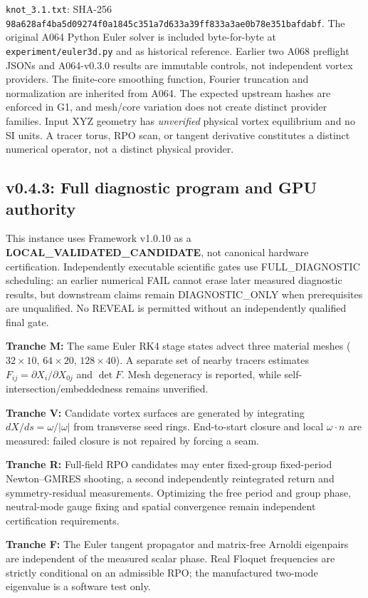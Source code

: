 \documentclass[11pt,a4paper]{article}
\begin{document}
\texttt{knot\_3.1.txt}: SHA-256 \texttt{98a628af4ba5d09274f0a1845c351a7}\allowbreak\texttt{d633a39ff833a3ae0b78e351bafdabf}. The original A064 Python Euler solver is included byte-for-byte at \texttt{experiment/euler3d.py} and as historical reference. Earlier two A068 preflight JSONs and A064-v0.3.0 results are immutable controls, not independent vortex providers. The finite-core smoothing function, Fourier truncation and normalization are inherited from A064. The expected upstream hashes are enforced in G1, and mesh/core variation does not create distinct provider families. Input XYZ geometry has \emph{unverified} physical vortex equilibrium and no SI units. A tracer torus, RPO scan, or tangent derivative constitutes a distinct numerical operator, not a distinct physical provider.

\subsection*{v0.4.3: Full diagnostic program and GPU authority}
This instance uses Framework v1.0.10 as a \textbf{LOCAL\_VALIDATED\_CANDIDATE}, not canonical hardware certification. Independently executable scientific gates use FULL\_DIAGNOSTIC scheduling: an earlier numerical FAIL cannot erase later measured diagnostic results, but downstream claims remain DIAGNOSTIC\_ONLY when prerequisites are unqualified. No REVEAL is permitted without an independently qualified final gate.\par
\textbf{Tranche M:} The same Euler RK4 stage states advect three material meshes ($32\times10$, $64\times20$, $128\times40$). A separate set of nearby tracers estimates $F_{ij}=\partial X_i/\partial X_{0j}$ and $\det F$. Mesh degeneracy is reported, while self-intersection/embeddedness remains unverified.\par
\textbf{Tranche V:} Candidate vortex surfaces are generated by integrating $dX/ds=\omega/|\omega|$ from transverse seed rings. End-to-start closure and local $\omega\cdot n$ are measured: failed closure is not repaired by forcing a seam.\par
\textbf{Tranche R:} Full-field RPO candidates may enter fixed-group fixed-period Newton--GMRES shooting, a second independently reintegrated return and symmetry-residual measurements. Optimizing the free period and group phase, neutral-mode gauge fixing and spatial convergence remain independent certification requirements.\par
\textbf{Tranche F:} The Euler tangent propagator and matrix-free Arnoldi eigenpairs are independent of the measured scalar phase. Real Floquet frequencies are strictly conditional on an admissible RPO; the manufactured two-mode eigenvalue is a software test only.\par
\end{document}

